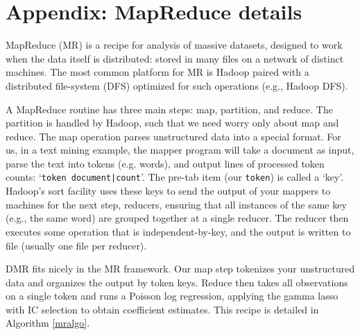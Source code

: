 \documentclass[12pt]{article}
\newcommand{\bs}[1]{\boldsymbol{#1}}
\newcommand{\bm}[1]{\mathbf{#1}}
\newcommand{\cd}[1]{{\tt#1}}
\begin{document}
\appendix
\section{Appendix: MapReduce details}
\label{MR}

  MapReduce  (MR) is a  recipe for analysis of massive datasets, designed to
work when the data itself is distributed: stored in many files on a network of
distinct machines. The most common platform for  MR is Hadoop paired with a
distributed file-system (DFS)  optimized for such operations (e.g., Hadoop DFS).

A MapReduce routine has three main steps: map, partition, and reduce.  The
partition  is handled by Hadoop, such that we need worry only
about map and reduce.  The map operation parses  unstructured data into a
special format.  For us, in a text mining example, the mapper program will
take a document as input, parse the text into tokens (e.g. words), and output
lines of processed token counts: `\cd{token   document|count}'.  The pre-tab
item (our \cd{token}) is called a `key'.  Hadoop's sort facility uses these
keys to send the output of your mappers to machines for the next step,
reducers, ensuring that all instances of the same key (e.g., the same word)
are grouped together at a single reducer.  The reducer then executes some
operation that is independent-by-key, and the output is written to file
(usually one file per reducer).

DMR fits nicely in the MR framework.  Our map step tokenizes your unstructured
data  and organizes the output by token keys.  Reduce then takes all
observations on a single token and runs a Poisson log regression, applying the
gamma lasso with IC selection to obtain coefficient estimates.   This recipe
is detailed in Algorithm \ref{mralgo}.

\end{document}
